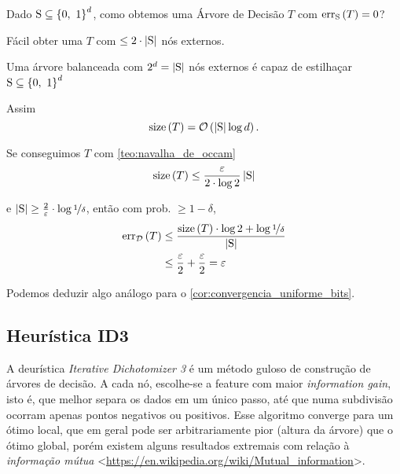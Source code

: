 Dado $\mathrm{S}\subseteq\left\{0,\ 1\vphantom{1j}\right\}^d$, como obtemos uma Árvore de Decisão $T$ com $\mathrm{err}_\mathrm{S}\left(T\vphantom{1j}\right)=0$?

\begin{exercicio}
  Fácil obter uma $T$ com $\leq2\cdot\left|\mathrm{S}\vphantom{1j}\right|$ nós externos.
\end{exercicio}
\begin{resolucao}
  Uma árvore balanceada com $2^d=\left|\mathrm{S}\vphantom{1j}\right|$ nós externos é capaz de estilhaçar $\mathrm{S}\subseteq\left\{0,\ 1\vphantom{1j}\right\}^d$
\end{resolucao}

Assim
\[
  \mathrm{size}\left(T\vphantom{1j}\right) = \mathcal{O}\left(\left|\mathrm{S}\vphantom{1j}\right|\log d\vphantom{1j}\right).
\]

Se conseguimos $T$ com \autoref{teo:navalha_de_occam}
\[
  \mathrm{size}\left(T\vphantom{1j}\right) \leq \frac{\varepsilon}{2\cdot\log 2} \left|\mathrm{S}\vphantom{1j}\right|
\]

e $\left|\mathrm{S}\vphantom{1j}\right|\geq\frac{2}{\varepsilon}\cdot\log\nicefrac{1}{\delta}$, então com prob. $\geq 1-\delta$,
\begin{align}
  \mathrm{err}_\mathcal{D}\left(T\vphantom{1j}\right) &\leq \frac{\mathrm{size}\left(T\vphantom{1j}\right)\cdot\log2 + \log\nicefrac{1}{\delta}}{\left|\mathrm{S}\vphantom{1j}\right|}  \\
                                  &\leq \frac{\varepsilon}{2} + \frac{\varepsilon}{2} = \varepsilon
\end{align}

Podemos deduzir algo análogo para o \autoref{cor:convergencia_uniforme_bits}.

\subsection{Heurística ID3}

A deurística \textit{Iterative Dichotomizer 3} é um método guloso de construção de árvores de decisão. A cada nó, escolhe-se a feature com maior \textit{information gain}, isto é, que melhor separa os dados em um único passo, até que numa subdivisão ocorram apenas pontos negativos ou positivos. Esse algoritmo converge para um ótimo local, que em geral pode ser arbitrariamente pior (altura da árvore) que o ótimo global, porém existem alguns resultados extremais com relação à \textit{informação mútua} <\href{https://en.wikipedia.org/wiki/Mutual\_information}{https://en.wikipedia.org/wiki/Mutual\_information}>.

